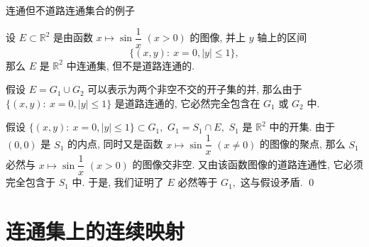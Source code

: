 
\begin{frame}{连通但不道路连通集合的例子}

设 $E \subset \mathbb{R}^2$ 是由函数 $x \mapsto \sin \dfrac{1}{x}$ $(x > 0)$ 的图像, 并上 $y$ 轴上的区间
\[\{(x,y): ~ x = 0, \lvert y \rvert \leqslant 1\},\]
那么 $E$ 是 $\mathbb{R}^2$ 中连通集, 但不是道路连通的.

\pause
\vspace{1em}

\startproof[bg=yellow, fg=red]
假设 $E = G_1 \cup G_2$ 可以表示为两个非空不交的开子集的并, 那么由于 $\{(x,y): ~ x = 0, \lvert y \rvert \leqslant 1\}$ 是道路连通的, 它必然完全包含在 $G_1$ 或 $G_2$ 中.

\pause
\vspace{0.5em}

假设 $\{(x,y): ~ x = 0, \lvert y \rvert \leqslant 1\} \subset G_1,$ $G_1 = S_1 \cap E,$ $S_1$ 是 $\mathbb{R}^2$ 中的开集. 由于 $(0, 0)$ 是 $S_1$ 的内点, 同时又是函数 $x \mapsto \sin \dfrac{1}{x}$ $(x \neq 0)$ 的图像的聚点, 那么 $S_1$ 必然与 $x \mapsto \sin \dfrac{1}{x}$ $(x > 0)$ 的图像交非空. 又由该函数图像的道路连通性, 它必须完全包含于 $S_1$ 中. 于是, 我们证明了 $E$ 必然等于 $G_1,$ 这与假设矛盾.
\qed


\end{frame}
\normalmode


\section{连通集上的连续映射}


